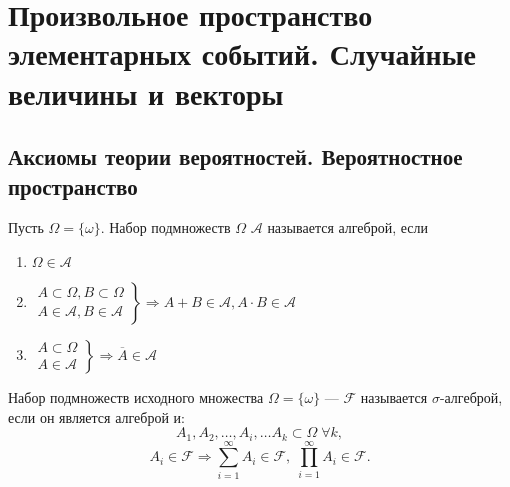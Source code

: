 \chapter{Произвольное пространство элементарных событий. Случайные величины и векторы}
\setcounter{equation}{0}
\section{Аксиомы теории вероятностей. Вероятностное пространство}
\begin{definition}
	Пусть $\Omega = \{\omega\}$. Набор подмножеств $\Omega$ $\mathcal{A}$ называется алгеброй, если
	\begin{enumerate}
		\item $\Omega \in \mathcal{A}$
		\item $\left.
			      \begin{aligned}
				      A \subset \Omega, B \subset \Omega \\
				      A \in \mathcal{A}, B \in \mathcal{A}
			      \end{aligned}
			      \right\} \Rightarrow A + B \in \mathcal{A}, A \cdot B \in \mathcal{A}$
		\item $\left.
			      \begin{aligned}
				      A \subset \Omega \\
				      A \in \mathcal{A}
			      \end{aligned}
			      \right\} \Rightarrow \overline{A} \in \mathcal{A}$
	\end{enumerate}
\end{definition}
\begin{definition}
	Набор подмножеств исходного множества $\Omega = \{\omega\}$ --- $\mathcal{F}$ называется $\sigma$-алгеброй, если он является алгеброй и:
	\[
		A_1, A_2, \dots, A_i, \dots A_k \subset \Omega \; \forall k,
	\]
	\[
		A_i \in \mathcal{F} \Rightarrow \sum\limits_{i=1}^\infty A_i \in \mathcal{F}, \; \prod\limits_{i=1}^\infty A_i \in \mathcal{F}.
	\]
\end{definition}
